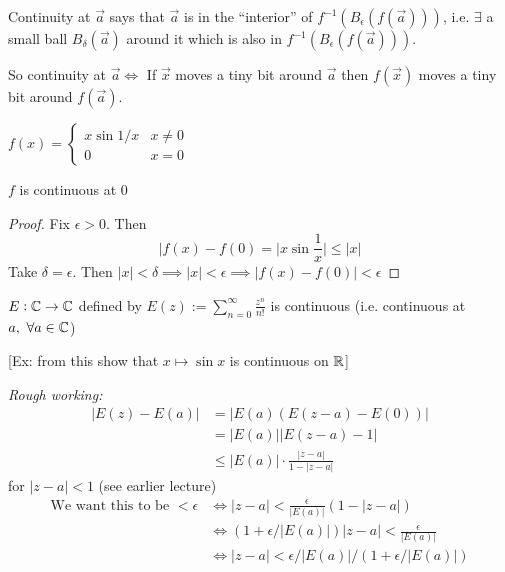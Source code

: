 Continuity at $\vec{a}$ says that $\vec{a}$ is in the ``interior'' of $f^{-1}(B_\epsilon (f(\vec{a})))$, i.e. $\exists$ a small ball $B_\delta (\vec{a})$ around it which is also in $f^{-1}(B_\epsilon(f(\vec{a})))$. 

So continuity at $\vec{a} \iff$ If $\vec{x}$ moves a tiny bit around $\vec{a}$ then $f(\vec{x})$ moves a tiny bit around $f(\vec{a})$.\pagebreak

\begin{example}
$f(x) = \begin{cases}
 	x\sin 1/x & x \neq 0\\
 	0 & x = 0
 \end{cases}$

\begin{center}
\end{center}


\begin{proposition}
$f$ is continuous at $0$	
\end{proposition}

\begin{proof}
Fix $\epsilon >0$. Then 
\[|f(x) - f(0) = |x\sin\frac{1}{x}| \leq |x|\]
Take $\delta = \epsilon$. Then $|x| < \delta \implies |x| < \epsilon \implies |f(x) - f(0)| < \epsilon$	
\end{proof}
\end{example}\vspace*{5pt}

\begin{proposition}
$E: \mathbb{C} \to \mathbb{C}$ defined by $E(z) := \sum_{n=0}^{\infty} \frac{z^n}{n!}$ is continuous (i.e. continuous at $a,~\forall a \in\mathbb{C}$)	
\end{proposition}
[Ex: from this show that $x \mapsto \sin x$ is continuous on $\mathbb{R}$]

\emph{Rough working:} 
\[\begin{aligned}
|E(z) - E(a)| &= |E(a)(E(z-a)-E(0))| \\ 	
&= |E(a)| |E(z-a) -1|\\
& \leq |E(a)| \cdot \frac{|z-a|}{1-|z-a|}
\end{aligned}
\]
for $|z-a| < 1$ (see earlier lecture)
\[\begin{aligned}
\text{We want this to be } < \epsilon &\iff |z-a| < \frac{\epsilon}{|E(a)|}(1-|z-a|)\\
&\iff (1 + \epsilon/|E(a)|)|z-a| < \frac{\epsilon}{|E(a)|}\\
&\iff |z-a| < \epsilon/|E(a)|/(1 + \epsilon/|E(a)|)
\end{aligned}
\]


